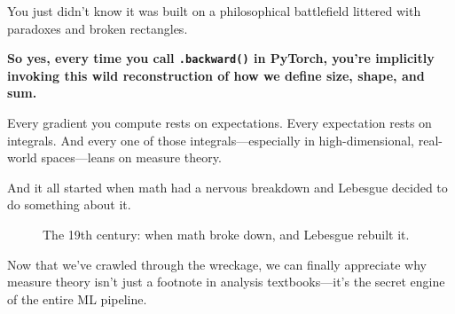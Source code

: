 You just didn’t know it was built on a philosophical battlefield littered with paradoxes and broken rectangles.

\textbf{So yes, every time you call \texttt{.backward()} in PyTorch, you’re implicitly invoking this wild reconstruction of how we define size, shape, and sum.}

Every gradient you compute rests on expectations. Every expectation rests on integrals. And every one of those integrals—especially in high-dimensional, real-world spaces—leans on measure theory.

And it all started when math had a nervous breakdown and Lebesgue decided to do something about it.

\vspace{1em}
\begin{figure}[H]
\centering
{}
\caption{The 19th century: when math broke down, and Lebesgue rebuilt it.}
\end{figure}

Now that we’ve crawled through the wreckage, we can finally appreciate why measure theory isn’t just a footnote in analysis textbooks—it’s the secret engine of the entire ML pipeline.